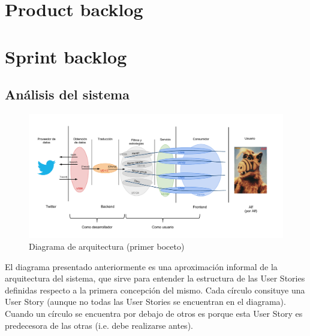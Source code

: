 \documentclass[10pt, a4paper]{article}
\begin{document}
\maketitle
\tableofcontents
\newpage

	\section{Product backlog}
		

	\section{Sprint backlog}
		

  \begin{landscape}
  \section{Análisis del sistema}
  \begin{figure}[H]
      \centering
      \includegraphics[scale=0.8]{graphics/arch_diagram.pdf}
      \caption{Diagrama de arquitectura (primer boceto)}
    \end{figure}
  \end{landscape}

  El diagrama presentado anteriormente es una aproximación informal de la arquitectura del sistema, que sirve para entender la estructura 
  de las \textsf{User Stories} definidas respecto a la primera concepción del mismo. Cada círculo consituye una \textsf{User Story} (aunque no todas las
  \textsf{User Stories} se encuentran en el diagrama). Cuando un círculo se encuentra por debajo de otros es porque esta \textsf{User Story} es predecesora
  de las otras (i.e. debe realizarse antes).
\end{document}
